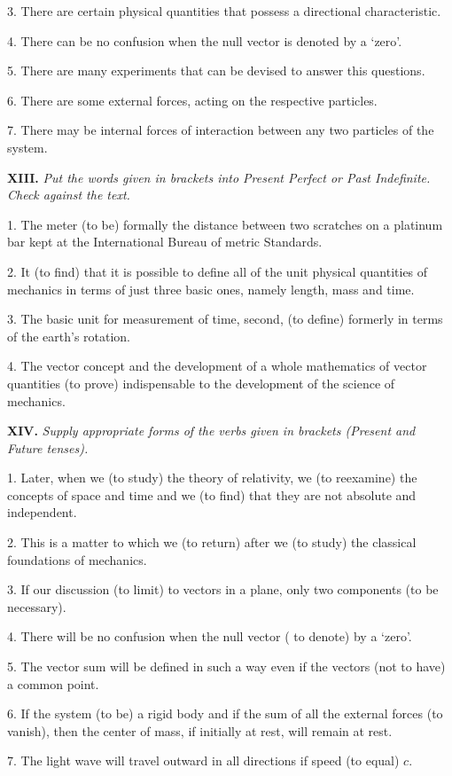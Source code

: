\documentclass[a4paper]{article}
\newcommand{\ETask}[2]{\medskip\par\textbf{#1.} \textit{#2}\par}
\begin{document}
3. There are certain physical quantities that possess a directional characteristic.

4. There can be no confusion when the null vector is denoted by a `zero'.

5. There are many experiments that can be devised to answer this questions.

6. There are some external forces, acting on the respective particles.

7. There may be internal forces of interaction between any two particles of the system.

\ETask{XIII}{Put the words given in brackets into Present Perfect or Past Indefinite. Check against the text.}
1. The meter (to be) formally the distance between two scratches on a platinum bar kept at the International Bureau of
metric Standards.

2. It (to find) that it is possible to define all of the unit physical quantities of mechanics in terms of just three basic
ones, namely length, mass and time.

3. The basic unit for measurement of time, second, (to define) formerly in terms of the earth's rotation.

4. The vector concept and the development of a whole mathematics of vector quantities (to prove) indispensable to the
development of the science of mechanics.

\ETask{XIV}{Supply appropriate forms of the verbs given in brackets (Present and Future tenses).}

1. Later, when we (to study) the theory of relativity, we (to reexamine) the concepts of space and time and we (to find)
that they are not absolute and independent.

2. This is a matter to which we (to return) after we (to study) the classical foundations of mechanics.

3. If our discussion (to limit) to vectors in a plane, only two components (to be necessary).

4. There will be no confusion when the null vector ( to denote) by a `zero'.

5. The vector sum will be defined in such a way even if the vectors (not to have) a common point.

6. If the system (to be) a rigid body and if the sum of all the external forces (to vanish), then the center of mass, if
initially at rest, will remain at rest.

7. The light wave will travel outward in all directions if speed (to equal) $c$.
\end{document}
